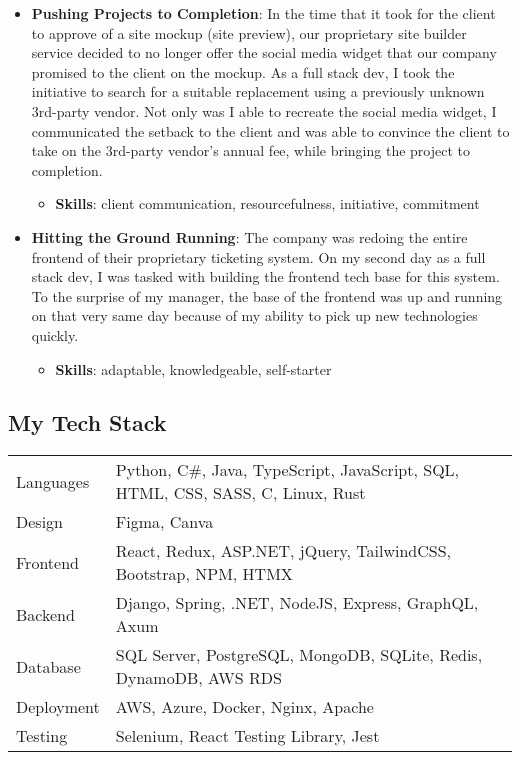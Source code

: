 \documentclass[letterpaper]{article}
\providecommand{\tightlist}{%
  \setlength{\itemsep}{0pt}\setlength{\parskip}{0pt}}
\begin{document}
\begin{itemize}
\tightlist
\item
  \textbf{Pushing Projects to Completion}: In the time that it took for
  the client to approve of a site mockup (site preview), our proprietary
  site builder service decided to no longer offer the social media
  widget that our company promised to the client on the mockup. As a
  full stack dev, I took the initiative to search for a suitable
  replacement using a previously unknown 3rd-party vendor. Not only was
  I able to recreate the social media widget, I communicated the setback
  to the client and was able to convince the client to take on the
  3rd-party vendor's annual fee, while bringing the project to
  completion.

  \begin{itemize}
  \tightlist
  \item
    \textbf{Skills}: client communication, resourcefulness, initiative,
    commitment
  \end{itemize}
\item
  \textbf{Hitting the Ground Running}: The company was redoing the
  entire frontend of their proprietary ticketing system. On my second
  day as a full stack dev, I was tasked with building the frontend tech
  base for this system. To the surprise of my manager, the base of the
  frontend was up and running on that very same day because of my
  ability to pick up new technologies quickly.

  \begin{itemize}
  \tightlist
  \item
    \textbf{Skills}: adaptable, knowledgeable, self-starter
  \end{itemize}
\end{itemize}

\hypertarget{my-tech-stack}{%
\subsection{My Tech Stack}\label{my-tech-stack}}

\begin{longtable}[]{@{}
  >{\raggedright\arraybackslash}p{}
  >{\raggedright\arraybackslash}p{}@{}}
\toprule\noalign{}
\endhead
\bottomrule\noalign{}
\endlastfoot
Languages & Python, C\#, Java, TypeScript, JavaScript, SQL, HTML, CSS,
SASS, C, Linux, Rust \\
Design & Figma, Canva \\
Frontend & React, Redux, ASP.NET, jQuery, TailwindCSS, Bootstrap, NPM,
HTMX \\
Backend & Django, Spring, .NET, NodeJS, Express, GraphQL, Axum \\
Database & SQL Server, PostgreSQL, MongoDB, SQLite, Redis, DynamoDB, AWS
RDS \\
Deployment & AWS, Azure, Docker, Nginx, Apache \\
Testing & Selenium, React Testing Library, Jest \\
\end{longtable}
\end{document}
